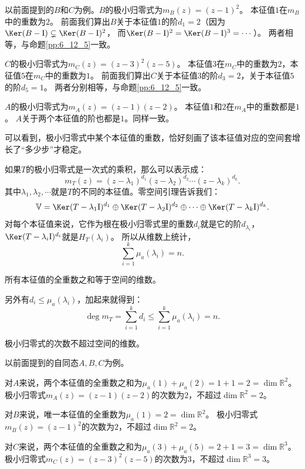 \documentclass[12pt,UTF8]{ctexbook}
\begin{document}
以前面提到的$B$和$C$为例。$B$的极小归零式为$m_B(z) = (z-1)^2$。
本征值$1$在$m_B$中的重数为$2$。
前面我们算出$B$关于本征值$1$的阶$d_1 = 2$（因为$\Ker(B-\mathrm{I}) \subsetneq \Ker(B-\mathrm{I})^2$，
而$\Ker(B-\mathrm{I})^2 = \Ker(B-\mathrm{I})^3 = \cdots$）。
两者相等，与命题\ref{pp:6_12_5}一致。

$C$的极小归零式为$m_C(z) = (z-3)^2(z-5)$。
本征值$3$在$m_C$中的重数为$2$，本征值$5$在$m_C$中的重数为$1$。
前面我们算出$C$关于本征值$3$的阶$d_3 = 2$，关于本征值$5$的阶$d_5 = 1$。
两者分别相等，与命题\ref{pp:6_12_5}一致。

$A$的极小归零式为$m_A(z) = (z-1)(z-2)$。
本征值$1$和$2$在$m_A$中的重数都是$1$。
$A$关于两个本征值的阶也都是$1$。同样一致。

可以看到，极小归零式中某个本征值的重数，恰好刻画了该本征值对应的空间套增长了“多少步”才稳定。

如果$T$的极小归零式是一次式的乘积，那么可以表示成：
$$ m_T(z) = (z - \lambda_1)^{d_1} (z - \lambda_2)^{d_2} \cdots  (z - \lambda_k)^{d_k}.$$
其中$\lambda_1, \lambda_2,\cdots$就是$T$的不同的本征值。零空间引理告诉我们：
$$ \mathbb{V} = \Ker (T - \lambda_1\mathrm{I})^{d_1} \oplus \Ker (T - \lambda_2\mathrm{I})^{d_2} \oplus \cdots \oplus \Ker (T - \lambda_k\mathrm{I})^{d_k}.$$
对每个本征值来说，它作为根在极小归零式里的重数$d_i$就是它的阶$d_{\lambda_i}$，
$\Ker (T - \lambda_i\mathrm{I})^{d_i}$就是$H_T(\lambda_i)$。
所以从维数上统计，
$$ \sum_{i=1}^k \mu_a(\lambda_i) = n.$$
\begin{pp}\label{pp:6_12_2_1}
    所有本征值的全重数之和等于空间的维数。
\end{pp}

另外有$d_i \leqslant \mu_a(\lambda_i)$，加起来就得到：
$$ \deg m_T = \sum_{i=1}^k d_i \leqslant \sum_{i=1}^k \mu_a(\lambda_i) = n.$$
\begin{pp}\label{pp:6_12_2_2}
    极小归零式的次数不超过空间的维数。
\end{pp}

以前面提到的自同态$A,B,C$为例。

对$A$来说，两个本征值的全重数之和为$\mu_a(1) + \mu_a(2) = 1 + 1 = 2 = \dim\mathbb{R}^2$。
极小归零式$m_A(z) = (z-1)(z-2)$的次数为$2$，不超过$\dim\mathbb{R}^2 = 2$。

对$B$来说，唯一本征值的全重数为$\mu_a(1) = 2 = \dim\mathbb{R}^2$。
极小归零式$m_B(z) = (z-1)^2$的次数为$2$，不超过$\dim\mathbb{R}^2 = 2$。

对$C$来说，两个本征值的全重数之和为$\mu_a(3) + \mu_a(5) = 2 + 1 = 3 = \dim\mathbb{R}^3$。
极小归零式$m_C(z) = (z-3)^2(z-5)$的次数为$3$，不超过$\dim\mathbb{R}^3 = 3$。
\end{document}
